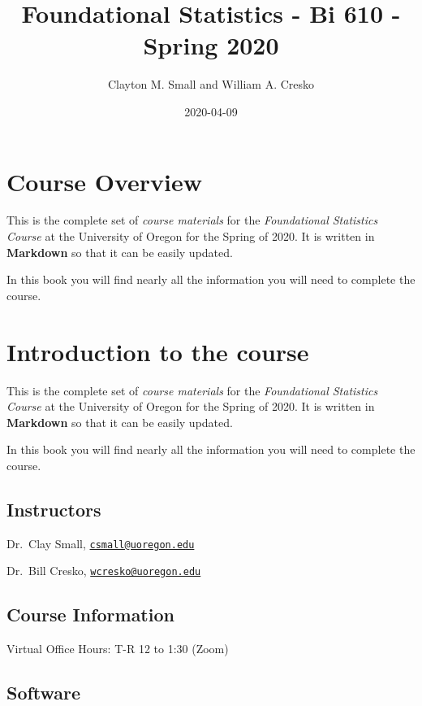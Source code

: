 \documentclass[]{book}
\title{Foundational Statistics - Bi 610 - Spring 2020}
\author{Clayton M. Small and William A. Cresko}
\date{2020-04-09}
\begin{document}
\maketitle

{
\setcounter{tocdepth}{1}
\tableofcontents
}
\hypertarget{course-overview}{%
\chapter{Course Overview}\label{course-overview}}

This is the complete set of \emph{course materials} for the \emph{Foundational Statistics Course} at the University of Oregon for the Spring of 2020. It is written in \textbf{Markdown} so that it can be easily updated.

In this book you will find nearly all the information you will need to complete the course.

\hypertarget{introduction-to-the-course}{%
\chapter{Introduction to the course}\label{introduction-to-the-course}}

This is the complete set of \emph{course materials} for the \emph{Foundational Statistics Course} at the University of Oregon for the Spring of 2020. It is written in \textbf{Markdown} so that it can be easily updated.

In this book you will find nearly all the information you will need to complete the course.

\hypertarget{instructors}{%
\section{Instructors}\label{instructors}}

Dr.~Clay Small, \href{mailto:csmall@uoregon.edu}{\nolinkurl{csmall@uoregon.edu}}

Dr.~Bill Cresko, \href{mailto:wcresko@uoregon.edu}{\nolinkurl{wcresko@uoregon.edu}}

\hypertarget{course-information}{%
\section{Course Information}\label{course-information}}

Virtual Office Hours: T-R 12 to 1:30 (Zoom)

\hypertarget{software}{%
\section{Software}\label{software}}
\end{document}
